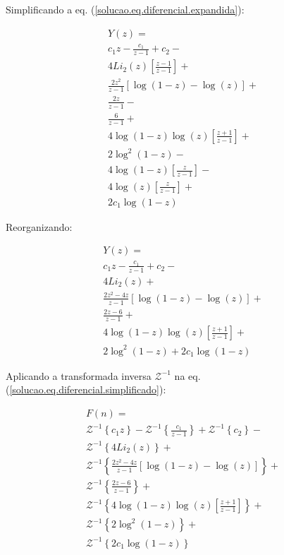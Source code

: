 \documentclass[a4paper,10pt]{article}
\begin{document}
Simplificando a eq. (\ref{solucao.eq.diferencial.expandida}):

$$
\begin{array}{lcl} 
 Y(z) = \\
 c_1z - \displaystyle \frac{c_1}{z-1}+ c_2-\\
 4 Li_2(z)\left[\displaystyle \frac{z - 1}{z-1}\right]+\\
 \displaystyle \frac{2 z^2 }{z-1}\displaystyle \left[\log(1-z) - \log(z)\right]+\\
 \displaystyle \frac{2 z}{z-1}-\\
 \displaystyle \frac{6}{z-1}+\\
 4 \log(1-z)\log(z) \left[\displaystyle \frac{ z  + 1}{z-1}\right]+\\
 2 \log^2(1-z) - \\
 4 \log(1-z) \left[\displaystyle \frac{ z }{z-1}\right]-\\
 4 \log(z)\left[\displaystyle \frac{ z }{z-1}\right] + \\
 2 c_1  \log(1-z)
\end{array}
$$

Reorganizando:

\begin{equation}
\begin{array}{lcl} 
 Y(z) = \\
 c_1z - \displaystyle \frac{c_1}{z-1}+  c_2-\\
 4 Li_2(z) +\\
 \displaystyle \frac{2 z^2 - 4z}{z-1}\displaystyle \left[\log(1-z) - \log(z)\right] +\\
 \displaystyle \frac{2 z - 6}{z-1}+\\
 4 \log(1-z)\log(z) \left[\displaystyle \frac{ z  + 1}{z-1}\right]+\\
 2 \log^2(1-z) + 2 c_1  \log(1-z)
\end{array} 
\label{solucao.eq.diferencial.simplificado}
\end{equation}


Aplicando a transformada  inversa $\mathcal{Z}^{-1}$ na eq. (\ref{solucao.eq.diferencial.simplificado}):


$$
\begin{array}{lcl} 
 F(n) = \\
 \mathcal{Z}^{-1}\left\{c_1z\right\} - 
 \mathcal{Z}^{-1}\left\{\displaystyle \frac{c_1}{z-1}\right\} + 
 \mathcal{Z}^{-1}\left\{c_2\right\}-\\
 \mathcal{Z}^{-1}\left\{4 Li_2(z)\right\}+\\
 \mathcal{Z}^{-1}\left\{\displaystyle \frac{2 z^2 - 4z}{z-1}\displaystyle \left[\log(1-z) - \log(z)\right]\right\} +\\
 \mathcal{Z}^{-1}\left\{\displaystyle \frac{2 z - 6}{z-1}\right\}+\\
 \mathcal{Z}^{-1}\left\{4 \log(1-z)\log(z) \left[\displaystyle \frac{ z  + 1}{z-1}\right]\right\}+\\
 \mathcal{Z}^{-1}\left\{2 \log^2(1-z)\right\} + \\
 \mathcal{Z}^{-1}\left\{2 c_1  \log(1-z)\right\} 
\end{array} 
$$
\end{document}
